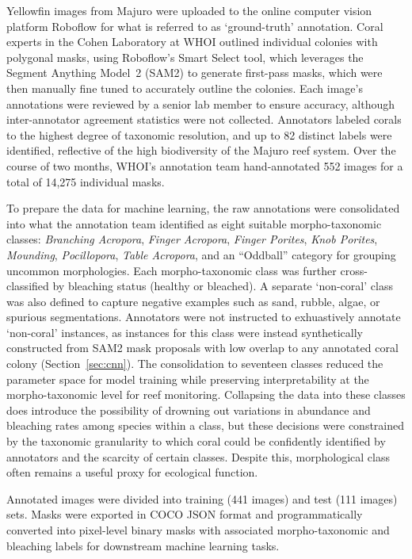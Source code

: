 \documentclass[11pt]{elsarticle}
\begin{document}
Yellowfin images from Majuro were uploaded to the online computer vision platform Roboflow \citep{roboflow2020} for what is referred to as `ground-truth' annotation. Coral experts in the Cohen Laboratory at WHOI outlined individual colonies with polygonal masks, using Roboflow's Smart Select tool, which leverages the Segment Anything Model~2 (SAM2) \citep{ravi2024sam2} to generate first-pass masks, which were then manually fine tuned to accurately outline the colonies. Each image's annotations were reviewed by a senior lab member to ensure accuracy, although inter-annotator agreement statistics were not collected. Annotators labeled corals to the highest degree of taxonomic resolution, and up to 82 distinct labels were identified, reflective of the high biodiversity of the Majuro reef system. Over the course of two months, WHOI's annotation team hand-annotated 552 images for a total of 14,275 individual masks.

To prepare the data for machine learning, the raw annotations were consolidated into what the annotation team identified as eight suitable morpho-taxonomic classes: \emph{Branching Acropora}, \emph{Finger Acropora}, \emph{Finger Porites}, \emph{Knob Porites}, \emph{Mounding}, \emph{Pocillopora}, \emph{Table Acropora}, and an ``Oddball'' category for grouping uncommon morphologies. Each morpho-taxonomic class was further cross-classified by bleaching status (healthy or bleached). A separate `non-coral' class was also defined to capture negative examples such as sand, rubble, algae, or spurious segmentations. Annotators were not instructed to exhuastively annotate `non-coral' instances, as instances for this class were instead synthetically constructed from SAM2 mask proposals with low overlap to any annotated coral colony (Section~\ref{sec:cnn}). The consolidation to seventeen classes reduced the parameter space for model training while preserving interpretability at the morpho-taxonomic level for reef monitoring. Collapsing the data into these classes does introduce the possibility of drowning out variations in abundance and bleaching rates among species within a class, but these decisions were constrained by the taxonomic granularity to which coral could be confidently identified by annotators and the scarcity of certain classes. Despite this, morphological class often remains a useful proxy for ecological function.

Annotated images were divided into training (441 images) and test (111 images) sets. Masks were exported in COCO JSON format and programmatically converted into pixel-level binary masks with associated morpho-taxonomic and bleaching labels for downstream machine learning tasks.
\end{document}
